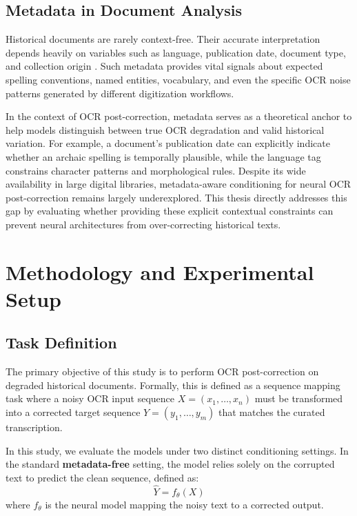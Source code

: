 \documentclass[11pt]{extarticle}
\begin{document}
\subsection{Metadata in Document Analysis}
Historical documents are rarely context-free. Their accurate interpretation depends heavily on variables such as language, publication date, document type, and collection origin \cite{vanstrien2020assessing}. Such metadata provides vital signals about expected spelling conventions, named entities, vocabulary, and even the specific OCR noise patterns generated by different digitization workflows. 

In the context of OCR post-correction, metadata serves as a theoretical anchor to help models distinguish between true OCR degradation and valid historical variation. For example, a document's publication date can explicitly indicate whether an archaic spelling is temporally plausible, while the language tag constrains character patterns and morphological rules. Despite its wide availability in large digital libraries, metadata-aware conditioning for neural OCR post-correction remains largely underexplored. This thesis directly addresses this gap by evaluating whether providing these explicit contextual constraints can prevent neural architectures from over-correcting historical texts.

\section{Methodology and Experimental Setup}

\subsection{Task Definition}
The primary objective of this study is to perform OCR post-correction on degraded historical documents. Formally, this is defined as a sequence mapping task where a noisy OCR input sequence $X = (x_1, \dots, x_n)$ must be transformed into a corrected target sequence $Y = (y_1, \dots, y_m)$ that matches the curated transcription.

In this study, we evaluate the models under two distinct conditioning settings. In the standard \textbf{metadata-free} setting, the model relies solely on the corrupted text to predict the clean sequence, defined as:
\begin{equation}
    \hat{Y} = f_{\theta}(X)
\end{equation}
where $f_{\theta}$ is the neural model mapping the noisy text to a corrected output.
\end{document}
